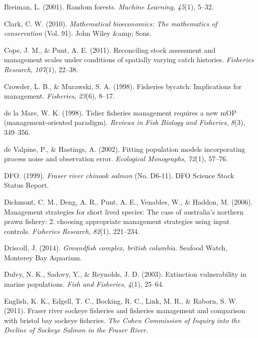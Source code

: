 \documentclass[12pt,]{scrartcl}
\begin{document}
\hypertarget{ref-breiman2001random}{}
Breiman, L. (2001). Random forests. \emph{Machine Learning},
\emph{45}(1), 5--32.

\hypertarget{ref-clark2010mathematical}{}
Clark, C. W. (2010). \emph{Mathematical bioeconomics: The mathematics of
conservation} (Vol. 91). John Wiley \&amp; Sons.

\hypertarget{ref-cope2011reconciling}{}
Cope, J. M., \& Punt, A. E. (2011). Reconciling stock assessment and
management scales under conditions of spatially varying catch histories.
\emph{Fisheries Research}, \emph{107}(1), 22--38.

\hypertarget{ref-crowder1998fisheries}{}
Crowder, L. B., \& Murawski, S. A. (1998). Fisheries bycatch:
Implications for management. \emph{Fisheries}, \emph{23}(6), 8--17.

\hypertarget{ref-de-la-Mare1998Tidier-fisherie}{}
de la Mare, W. K. (1998). Tidier fisheries management requires a new mOP
(management-oriented paradigm). \emph{Reviews in Fish Biology and
Fisheries}, \emph{8}(3), 349--356.

\hypertarget{ref-de2002fitting}{}
de Valpine, P., \& Hastings, A. (2002). Fitting population models
incorporating process noise and observation error. \emph{Ecological
Monographs}, \emph{72}(1), 57--76.

\hypertarget{ref-DFO1999Fraser-River-Ch}{}
DFO. (1999). \emph{Fraser river chinook salmon} (No. D6-11). DFO Science
Stock Status Report.

\hypertarget{ref-dichmont2006management2}{}
Dichmont, C. M., Deng, A. R., Punt, A. E., Venables, W., \& Haddon, M.
(2006). Management strategies for short lived species: The case of
australia's northern prawn fishery: 2. choosing appropriate management
strategies using input controls. \emph{Fisheries Research},
\emph{82}(1), 221--234.

\hypertarget{ref-Driscoll2014Groundfish-comp}{}
Driscoll, J. (2014). \emph{Groundfish complex, british columbia}.
Seafood Watch, Monterey Bay Aquarium.

\hypertarget{ref-dulvy2003extinction}{}
Dulvy, N. K., Sadovy, Y., \& Reynolds, J. D. (2003). Extinction
vulnerability in marine populations. \emph{Fish and Fisheries},
\emph{4}(1), 25--64.

\hypertarget{ref-english2011fraser}{}
English, K. K., Edgell, T. C., Bocking, R. C., Link, M. R., \& Raborn,
S. W. (2011). Fraser river sockeye fisheries and fisheries management
and comparison with bristol bay sockeye fisheries. \emph{The Cohen
Commission of Inquiry into the Decline of Sockeye Salmon in the Fraser
River}.
\end{document}
